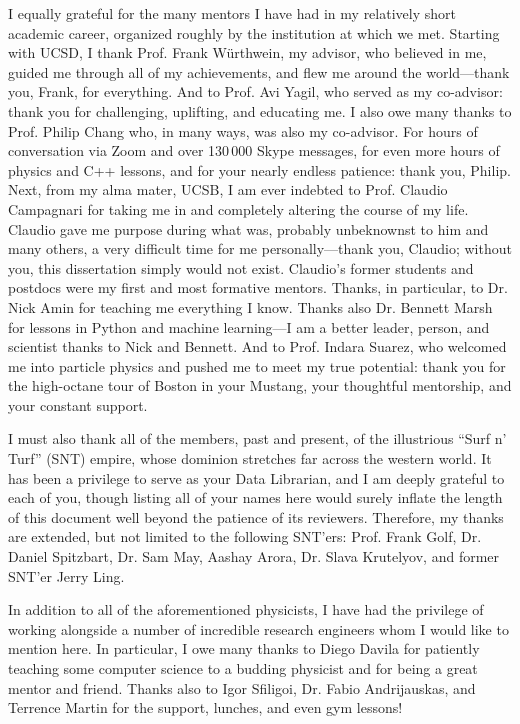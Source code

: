 \begin{acknowledgements}
I equally grateful for the many mentors I have had in my relatively short academic career, organized roughly by the institution at which we met. 
Starting with UCSD, I thank Prof. Frank W\"urthwein, my advisor, who believed in me, guided me through all of my achievements, and flew me around the world---thank you, Frank, for everything. 
And to Prof. Avi Yagil, who served as my co-advisor: thank you for challenging, uplifting, and educating me. 
I also owe many thanks to Prof. Philip Chang who, in many ways, was also my co-advisor. 
For hours of conversation via Zoom and over 130\,000 Skype messages, for even more hours of physics and C++ lessons, and for your nearly endless patience: thank you, Philip. 
Next, from my alma mater, UCSB, I am ever indebted to Prof. Claudio Campagnari for taking me in and completely altering the course of my life. 
Claudio gave me purpose during what was, probably unbeknownst to him and many others, a very difficult time for me personally---thank you, Claudio; without you, this dissertation simply would not exist. 
Claudio's former students and postdocs were my first and most formative mentors. 
Thanks, in particular, to Dr. Nick Amin for teaching me everything I know. 
Thanks also Dr. Bennett Marsh for lessons in Python and machine learning---I am a better leader, person, and scientist thanks to Nick and Bennett. 
And to Prof. Indara Suarez, who welcomed me into particle physics and pushed me to meet my true potential: thank you for the high-octane tour of Boston in your Mustang, your thoughtful mentorship, and your constant support. 

I must also thank all of the members, past and present, of the illustrious ``Surf n' Turf'' (SNT) empire, whose dominion stretches far across the western world. 
It has been a privilege to serve as your Data Librarian, and I am deeply grateful to each of you, though listing all of your names here would surely inflate the length of this document well beyond the patience of its reviewers. 
Therefore, my thanks are extended, but not limited to the following SNT'ers: Prof. Frank Golf, Dr. Daniel Spitzbart, Dr. Sam May, Aashay Arora, Dr. Slava Krutelyov, and former SNT'er Jerry Ling.

In addition to all of the aforementioned physicists, I have had the privilege of working alongside a number of incredible research engineers whom I would like to mention here. 
In particular, I owe many thanks to Diego Davila for patiently teaching some computer science to a budding physicist and for being a great mentor and friend. 
Thanks also to Igor Sfiligoi, Dr. Fabio Andrijauskas, and Terrence Martin for the support, lunches, and even gym lessons! 


\end{acknowledgements}
